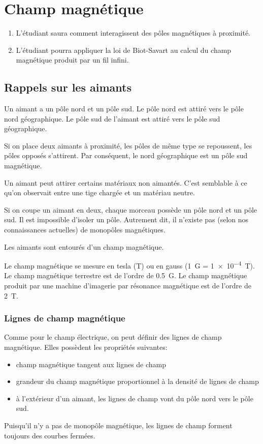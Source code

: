 \chapter{Champ magnétique}


\begin{enumerate}
  \item L'étudiant saura comment interagissent des pôles magnétiques à
    proximité.
  \item L'étudiant pourra appliquer la loi de Biot-Savart au calcul du champ
    magnétique produit par un fil infini.
\end{enumerate}


\section{Rappels sur les aimants}


Un aimant a un pôle nord et un pôle sud. Le pôle nord est attiré vers le pôle
nord géographique. Le pôle sud de l'aimant est attiré vers le pôle sud
géographique.

Si on place deux aimants à proximité, les pôles de même type se repoussent, les
pôles opposés s'attirent. Par conséquent, le nord géographique est un pôle sud
magnétique.

Un aimant peut attirer certains matériaux non aimantés. C'est semblable à ce
qu'on observait entre une tige chargée et un matériau neutre.

Si on coupe un aimant en deux, chaque morceau possède un pôle nord et un pôle
sud. Il est impossible d'isoler un pôle. Autrement dit, il n'existe pas (selon
nos connaissances actuelles) de monopôles magnétiques.

Les aimants sont entourés d'un champ magnétique.

Le champ magnétique se mesure en tesla (\si{T}) ou en gauss (\SI{1}{G} =
\SI{1e-4}{T}). Le champ magnétique terrestre est de l'ordre de \SI{0.5}{G}. Le
champ magnétique produit par une machine d'imagerie par résonance magnétique
est de l'ordre de \SI{2}{T}.


\subsection{Lignes de champ magnétique}

Comme pour le champ électrique, on peut définir des lignes de champ magnétique.
Elles possèdent les propriétés suivantes:
\begin{itemize}
  \item champ magnétique tangent aux lignes de champ
  \item grandeur du champ magnétique proportionnel à la densité de lignes de
    champ
  \item à l'extérieur d'un aimant, les lignes de champ vont du pôle nord vers
    le pôle sud.
\end{itemize}
Puisqu'il n'y a pas de monopôle magnétique, les lignes de champ forment
toujours des courbes fermées.



